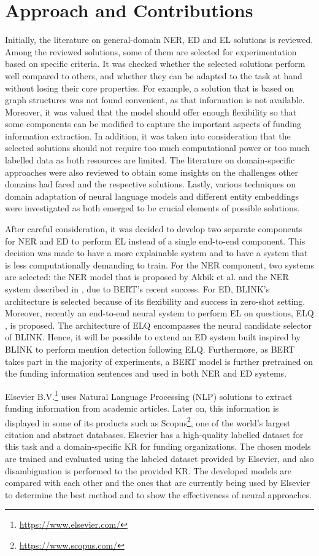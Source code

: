 \documentclass{report}
\theoremstyle{definition}
\theoremstyle{remark}
\begin{document}
\section{Approach and Contributions}
Initially, the literature on general-domain NER, ED and EL solutions is reviewed. Among the reviewed solutions, some of them are selected for experimentation based on specific criteria. It was checked whether the selected solutions perform well compared to others, and whether they can be adapted to the task at hand without losing their core properties. For example, a solution that is based on graph structures was not found convenient, as that information is not available. Moreover, it was valued that the model should offer enough flexibility so that some components can be modified to capture the important aspects of funding information extraction. In addition, it was taken into consideration that the selected solutions should not require too much computational power or too much labelled data as both resources are limited. The literature on domain-specific approaches were also reviewed to obtain some insights on the challenges other domains had faced and the respective solutions. Lastly, various techniques on domain adaptation of neural language models and different entity embeddings were investigated as both emerged to be crucial elements of possible solutions.  

After careful consideration, it was decided to develop two separate components for NER and ED to perform EL instead of a single end-to-end component. This decision was made to have a more explainable system and to have a system that is less computationally demanding to train. For the NER component, two systems are selected: the NER model that is proposed by Akbik et al. \cite{flairlib} and the NER system described in \cite{BERT}, due to BERT's \cite{BERT} recent success. For ED, BLINK's architecture \cite{scalablezeroshot} is selected because of its flexibility and success in zero-shot setting. Moreover, recently an end-to-end neural system to perform EL on questions, ELQ \cite{elq}, is proposed. The architecture of ELQ encompasses the neural candidate selector of BLINK. Hence, it will be possible to extend an ED system built inspired by BLINK to perform mention detection following ELQ. Furthermore, as BERT takes part in the majority of experiments, a BERT model is further pretrained on the funding information sentences and used in both NER and ED systems. 

Elsevier B.V.\footnote{\url{https://www.elsevier.com/}} uses Natural Language Processing (NLP) solutions to extract funding information from academic articles. Later on, this information is displayed in some of its products such as Scopus\footnote{\url{https://www.scopus.com/}}, one of the world's largest citation and abstract databases. Elsevier has a high-quality labelled dataset for this task and a domain-specific KR for funding organizations. The chosen models are trained and evaluated using the labeled dataset provided by Elsevier, and also disambiguation is performed to the provided KR. The developed models are compared with each other and the ones that are currently being used by Elsevier to determine the best method and to show the effectiveness of neural approaches.
\end{document}

